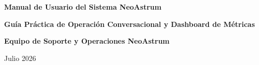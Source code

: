 \documentclass[11pt,a4paper]{article}
\begin{document}
\begin{titlepage}
    \centering
    \vspace*{2cm}
    
    {\Huge\bfseries Manual de Usuario del Sistema NeoAstrum\par}
    \vspace{1cm}
    {\Large\bfseries Guía Práctica de Operación Conversacional y Dashboard de Métricas\par}
    \vspace{2cm}
    
    {\large\bfseries Equipo de Soporte y Operaciones NeoAstrum\par}
    \vfill
    
    {\large Julio 2026 \par}
\end{titlepage}

\tableofcontents
\newpage





\end{document}
